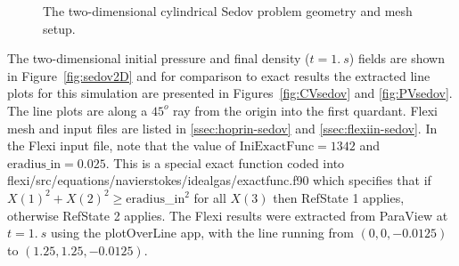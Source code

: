 \begin{figure}[h!]
 \begin{center}
  
  \caption{The two-dimensional cylindrical Sedov problem geometry and mesh setup.}
  \label{fig:SedovGeom}
 \end{center}
\end{figure}

The two-dimensional initial pressure and final density ($t = 1.\ s$) fields are shown in Figure~\ref{fig:sedov2D} and for comparison to exact results the extracted line plots for this simulation are presented in Figures~\ref{fig:CVsedov} and \ref{fig:PVsedov}.  The line plots are along a $45^o$ ray from the origin into the first quardant.  Flexi mesh and input files are listed in \ref{ssec:hoprin-sedov} and \ref{ssec:flexiin-sedov}.  In the Flexi input file, note that the value of $\mathrm{IniExactFunc} = 1342$ and $\mathrm{eradius\_in} = 0.025$.  This is a special exact function coded into flexi/src/equations/navierstokes/idealgas/exactfunc.f90 which specifies that if $X(1)^2 + X(2)^2 \ge \mathrm{eradius}$\_$\mathrm{in}^2$ for all $X(3)$ then RefState 1 applies, otherwise RefState 2 applies.  The Flexi results were extracted from ParaView at $t = 1.\ s$ using the plotOverLine app, with the line running from $(0,0,-0.0125)$ to $(1.25, 1.25, -0.0125)$.

